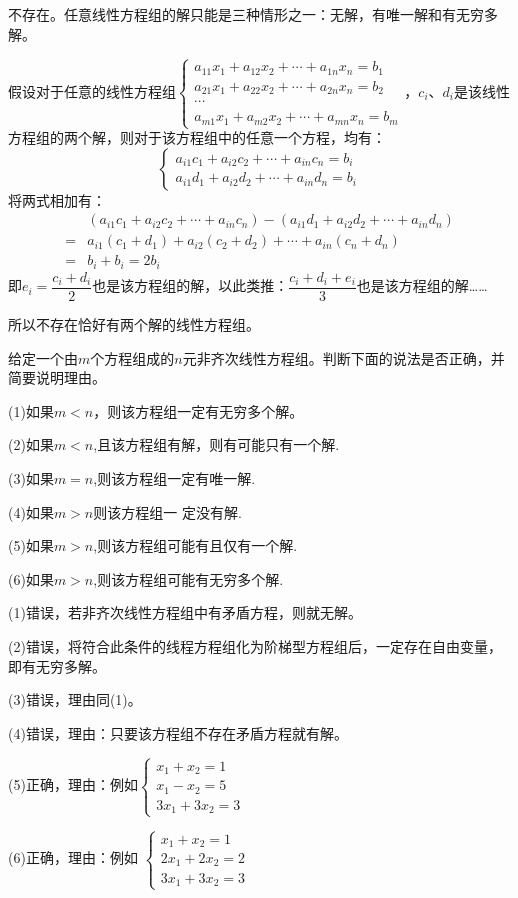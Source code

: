 \documentclass[a4paper]{report}
\begin{document}
\begin{jie}
不存在。任意线性方程组的解只能是三种情形之一：无解，有唯一解和有无穷多解。

假设对于任意的线性方程组$
\begin{cases}
a_{11}x_{1}+a_{12}x_{2}+\cdots+a_{1n}x_{n}=b_1\\
a_{21}x_{1}+a_{22}x_{2}+\cdots+a_{2n}x_{n}=b_2\\
\cdots\\
a_{m1}x_{1}+a_{m2}x_{2}+\cdots+a_{mn}x_{n}=b_m \end{cases}
$，$c_i$、$d_i$是该线性方程组的两个解，则对于该方程组中的任意一个方程，均有：
\begin{equation*}
  \begin{cases}
   a_{i1}c_{1}+a_{i2}c_{2}+\cdots+a_{in}c_{n}=b_i\\
   a_{i1}d_{1}+a_{i2}d_{2}+\cdots+a_{in}d_{n}=b_i
  \end{cases}
\end{equation*}
将两式相加有：
\begin{align*}
&(a_{i1}c_{1}+a_{i2}c_{2}+\cdots+a_{in}c_{n})-(a_{i1}d_{1}+a_{i2}d_{2}+\cdots+a_{in}d_{n})\\
=&a_{i1}(c_{1}+d_{1})+a_{i2}(c_{2}+d_{2})+\cdots+a_{in}(c_{n}+d_{n})\\
=&b_i + b_i =2b_i
\end{align*}
即$e_i=\dfrac{c_i+d_i}{2}$也是该方程组的解，以此类推：$\dfrac{c_i+d_i+e_i}{3}$也是该方程组的解……

所以不存在恰好有两个解的线性方程组。
\end{jie}

\EX 给定一个由$m$个方程组成的$n$元非齐次线性方程组。判断下面的说法是否正确，并简要说明理由。

(1)如果$m<n$，则该方程组一定有无穷多个解。

(2)如果$m< n$,且该方程组有解，则有可能只有一个解.

(3)如果$m=n$,则该方程组一定有唯一解.

(4)如果$m>n$则该方程组一 定没有解.

(5)如果$m> n$,则该方程组可能有且仅有一个解.

(6)如果$m> n$,则该方程组可能有无穷多个解.

\begin{jie}
(1)错误，若非齐次线性方程组中有矛盾方程，则就无解。

(2)错误，将符合此条件的线程方程组化为阶梯型方程组后，一定存在自由变量，即有无穷多解。

(3)错误，理由同(1)。

(4)错误，理由：只要该方程组不存在矛盾方程就有解。

(5)正确，理由：例如$
\begin{cases}
x_1+x_2=1\\
x_1-x_2=5\\
3x_1+3x_2=3
\end{cases}
$

(6)正确，理由：例如
$
\begin{cases}
x_1+x_2=1\\
2x_1+2x_2=2\\
3x_1+3x_2=3
\end{cases}
$
\end{jie}
\end{document}
